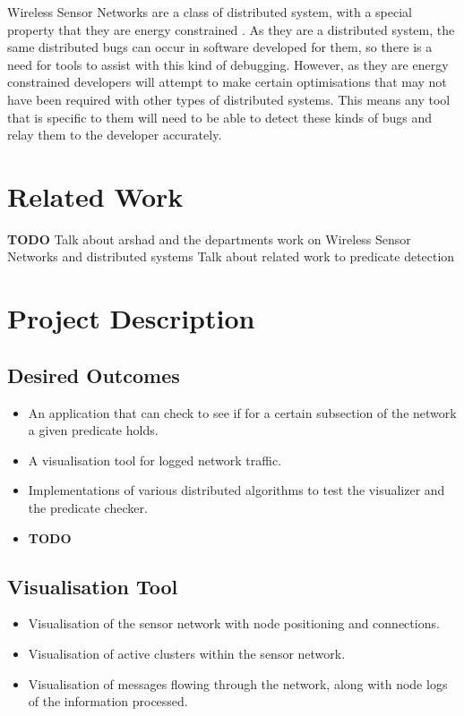 \documentclass[a4paper]{article}
\begin{document}
Wireless Sensor Networks are a class of distributed system, with a special property that they are energy constrained \cite{6023235}.  As they are a distributed system, the same distributed bugs can occur in software developed for them, so there is a need for tools to assist with this kind of debugging. However, as they are energy constrained developers will attempt to make certain optimisations that may not have been required with other types of distributed systems. This means any tool that is specific to them will need to be able to detect these kinds of bugs and relay them to the developer accurately.

\section{Related Work}

\textbf{TODO}
Talk about arshad and the departments work on Wireless Sensor Networks and distributed systems
Talk about related work to predicate detection

\clearpage

\section{Project Description}

\subsection{Desired Outcomes}
\begin{itemize}
	\item An application that can check to see if for a certain subsection of the network a given predicate holds.
	\item A visualisation tool for logged network traffic.
	\item Implementations of various distributed algorithms to test the visualizer and the predicate checker.
	\item \textbf{TODO}
\end{itemize}

\subsection{Visualisation Tool}
\begin{itemize}
	\item Visualisation of the sensor network with node positioning and connections.
	\item Visualisation of active clusters within the sensor network.
	\item Visualisation of messages flowing through the network, along with node logs of the information processed.
\end{itemize}
\end{document}
